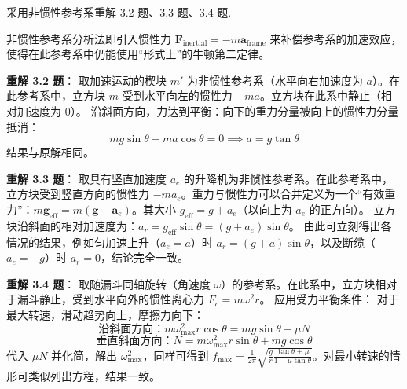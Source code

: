 \begin{exercise}\label{ex:3.6}
采用非惯性参考系重解 3.2 题、3.3 题、3.4 题.
\end{exercise}
\begin{solution}
非惯性参考系分析法即引入惯性力 $\boldsymbol{F}_{\mathrm{inertial}} = -m \boldsymbol{a}_{\text{frame}}$ 来补偿参考系的加速效应，使得在此参考系中仍能使用“形式上”的牛顿第二定律。

\textbf{重解 3.2 题}：
取加速运动的楔块 $m'$ 为非惯性参考系（水平向右加速度为 $a$）。在此参考系中，立方块 $m$ 受到水平向左的惯性力 $-ma$。立方块在此系中静止（相对加速度为 0）。
沿斜面方向，力达到平衡：向下的重力分量被向上的惯性力分量抵消：
$$ mg \sin\theta - m a \cos\theta = 0 \implies a = g \tan\theta $$
结果与原解相同。

\textbf{重解 3.3 题}：
取具有竖直加速度 $a_e$ 的升降机为非惯性参考系。在此参考系中，立方块受到竖直方向的惯性力 $-ma_e$。重力与惯性力可以合并定义为一个“有效重力”：$m \boldsymbol{g}_{\mathrm{eff}} = m(\boldsymbol{g} - \boldsymbol{a}_e)$。其大小 $g_{\mathrm{eff}} = g + a_e$（以向上为 $a_e$ 的正方向）。
立方块沿斜面的相对加速度为：$a_r = g_{\mathrm{eff}} \sin\theta = (g + a_e) \sin\theta$。
由此可立刻得出各情况的结果，例如匀加速上升（$a_e = a$）时 $a_r = (g + a)\sin\theta$，以及断缆（$a_e = -g$）时 $a_r = 0$，结论完全一致。

\textbf{重解 3.4 题}：
取随漏斗同轴旋转（角速度 $\omega$）的参考系。在此系中，立方块相对于漏斗静止，受到水平向外的惯性离心力 $F_c = m \omega^2 r$。
应用受力平衡条件：
对于最大转速，滑动趋势向上，摩擦力向下：
$$ \text{沿斜面方向：} m \omega_{\max}^2 r \cos\theta = mg \sin\theta + \mu N $$
$$ \text{垂直斜面方向：} N = m \omega_{\max}^2 r \sin\theta + mg \cos\theta $$
代入 $\mu N$ 并化简，解出 $\omega_{\max}^2$，同样可得到 $f_{\max} = \frac{1}{2\pi} \sqrt{ \frac{g}{r} \frac{\tan\theta + \mu}{1 - \mu \tan\theta} }$。对最小转速的情形可类似列出方程，结果一致。
\end{solution}

